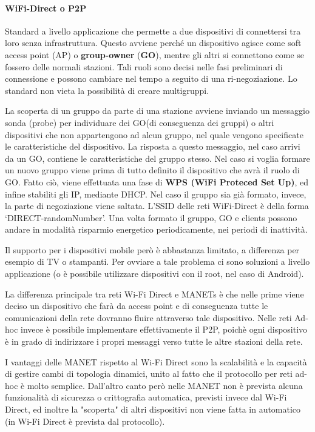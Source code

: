 \paragraph{WiFi-Direct o P2P}\label{wifi-direct-o-p2p}

Standard a livello applicazione che permette a due dispositivi di connettersi 
tra loro senza infrastruttura. Questo avviene perché un dispositivo agisce come 
soft access point (AP) o \textbf{group-owner} (\textbf{GO}), mentre gli altri si 
connettono come se fossero delle normali stazioni. Tali ruoli sono decisi nelle 
fasi preliminari di connessione e possono cambiare nel tempo a seguito di una 
ri-negoziazione. Lo standard non vieta la possibilità di creare multigruppi.

La scoperta di un gruppo da parte di una stazione avviene inviando un messaggio 
sonda (probe) per individuare dei GO(di conseguenza dei gruppi) o altri 
dispositivi che non appartengono ad alcun gruppo, nel quale vengono specificate 
le caratteristiche del dispositivo. La risposta a questo messaggio, nel caso 
arrivi da un GO, contiene le caratteristiche del gruppo stesso. Nel caso si 
voglia formare un nuovo gruppo viene prima di tutto definito il dispositivo
che avrà il ruolo di GO. Fatto ciò, viene effettuata una fase di 
\textbf{WPS (WiFi Proteced Set Up)}, ed infine stabiliti gli IP, mediante DHCP. 
Nel caso il gruppo sia già formato, invece, la parte di negoziazione viene 
saltata. L'SSID delle reti WiFi-Direct è della forma `DIRECT-randomNumber'.
Una volta formato il gruppo, GO e clients possono andare in modalità risparmio energetico 
periodicamente, nei periodi di inattività.

Il supporto per i dispositivi mobile però è abbastanza limitato, a differenza per 
esempio di TV o stampanti. Per ovviare a tale problema ci sono soluzioni a 
livello applicazione (o è possibile utilizzare dispositivi con il root, nel caso 
di Android).

La differenza principale tra reti Wi-Fi Direct e MANETs è che nelle prime 
viene deciso un dispositivo che farà da access point e di conseguenza tutte le 
comunicazioni della rete dovranno fluire attraverso tale dispositivo. Nelle reti
Ad-hoc invece è possibile implementare effettivamente il P2P, poichè ogni 
dispositivo è in grado di indirizzare i propri messaggi verso tutte le altre 
stazioni della rete.

I vantaggi delle MANET rispetto al Wi-Fi Direct sono la scalabilità e la 
capacità di gestire cambi di topologia dinamici, unito al fatto che il 
protocollo per reti ad-hoc è molto semplice. Dall'altro canto però nelle MANET 
non è prevista alcuna funzionalità di sicurezza o crittografia automatica, 
previsti invece dal Wi-Fi Direct, ed inoltre la "scoperta" di altri dispositivi
non viene fatta in automatico (in Wi-Fi Direct è prevista dal protocollo).


